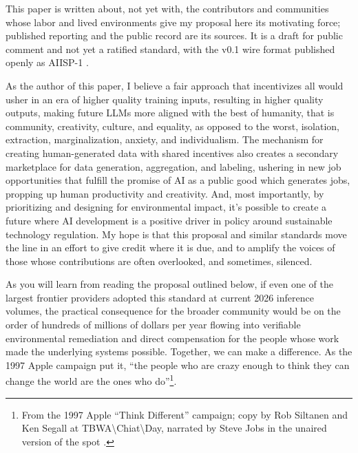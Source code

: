 \documentclass[10pt,a4paper,twocolumn]{article}
\begin{document}
This paper is written about, not yet with, the contributors and communities whose labor and lived environments give my proposal here its motivating force; published reporting and the public record are its sources. It is a draft for public comment and not yet a ratified standard, with the v0.1 wire format published openly as AIISP-1 \citep{aiisp1spec2026}.

As the author of this paper, I believe a fair approach that incentivizes all would usher in an era of higher quality training inputs, resulting in higher quality outputs, making future LLMs more aligned with the best of humanity, that is community, creativity, culture, and equality, as opposed to the worst, isolation, extraction, marginalization, anxiety, and individualism. The mechanism for creating human-generated data with shared incentives also creates a secondary marketplace for data generation, aggregation, and labeling, ushering in new job opportunities that fulfill the promise of AI as a public good which generates jobs, propping up human productivity and creativity. And, most importantly, by prioritizing and designing for environmental impact, it's possible to create a future where AI development is a positive driver in policy around sustainable technology regulation. My hope is that this proposal and similar standards move the line in an effort to give credit where it is due, and to amplify the voices of those whose contributions are often overlooked, and sometimes, silenced.

As you will learn from reading the proposal outlined below, if even one of the largest frontier providers adopted this standard at current 2026 inference volumes, the practical consequence for the broader community would be on the order of hundreds of millions of dollars per year flowing into verifiable environmental remediation and direct compensation for the people whose work made the underlying systems possible. Together, we can make a difference. As the 1997 Apple campaign put it, ``the people who are crazy enough to think they can change the world are the ones who do''\footnote{From the 1997 Apple ``Think Different'' campaign; copy by Rob Siltanen and Ken Segall at TBWA\textbackslash{}Chiat\textbackslash{}Day, narrated by Steve Jobs in the unaired version of the spot \citep{jobs1997thinkdifferent}.}.
\end{document}
